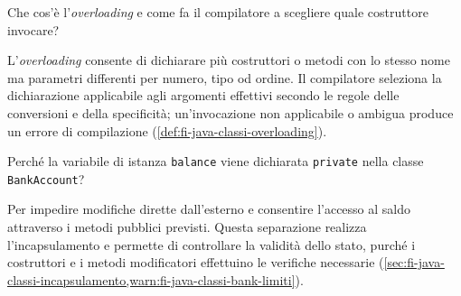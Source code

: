 \begin{exercise}
\label{ex:fi-esercizi-java-classi-overloading}
Che cos'è l'\emph{overloading} e come fa il compilatore a scegliere
quale costruttore invocare?
\end{exercise}

L'\emph{overloading} consente di dichiarare più costruttori o
metodi con lo stesso nome ma parametri differenti per numero,
tipo od ordine. Il compilatore seleziona la dichiarazione
applicabile agli argomenti effettivi secondo le regole delle
conversioni e della specificità; un'invocazione non applicabile
o ambigua produce un errore di compilazione
(\cref{def:fi-java-classi-overloading}).

\begin{exercise}
\label{ex:fi-esercizi-java-classi-private-balance}
Perché la variabile di istanza \texttt{balance} viene dichiarata
\texttt{private} nella classe \texttt{BankAccount}?
\end{exercise}

Per impedire modifiche dirette dall'esterno e consentire l'accesso
al saldo attraverso i metodi pubblici previsti. Questa separazione
realizza l'incapsulamento e permette di controllare la validità
dello stato, purché i costruttori e i metodi modificatori effettuino
le verifiche necessarie
(\cref{sec:fi-java-classi-incapsulamento,warn:fi-java-classi-bank-limiti}).
